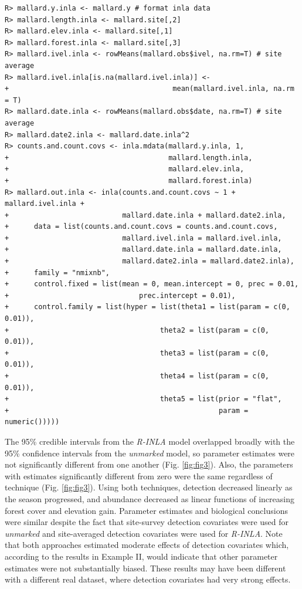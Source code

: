 \documentclass{article}
\begin{document}
\begin{verbatim}
R> mallard.y.inla <- mallard.y # format inla data
R> mallard.length.inla <- mallard.site[,2]
R> mallard.elev.inla <- mallard.site[,1]
R> mallard.forest.inla <- mallard.site[,3]
R> mallard.ivel.inla <- rowMeans(mallard.obs$ivel, na.rm=T) # site average
R> mallard.ivel.inla[is.na(mallard.ivel.inla)] <- 
+                                       mean(mallard.ivel.inla, na.rm = T)
R> mallard.date.inla <- rowMeans(mallard.obs$date, na.rm=T) # site average
R> mallard.date2.inla <- mallard.date.inla^2
R> counts.and.count.covs <- inla.mdata(mallard.y.inla, 1, 
+                                      mallard.length.inla,
+                                      mallard.elev.inla, 
+                                      mallard.forest.inla)
R> mallard.out.inla <- inla(counts.and.count.covs ~ 1 + mallard.ivel.inla +
+                           mallard.date.inla + mallard.date2.inla,
+      data = list(counts.and.count.covs = counts.and.count.covs,
+                           mallard.ivel.inla = mallard.ivel.inla,
+                           mallard.date.inla = mallard.date.inla,
+                           mallard.date2.inla = mallard.date2.inla),
+      family = "nmixnb",
+      control.fixed = list(mean = 0, mean.intercept = 0, prec = 0.01,
+                               prec.intercept = 0.01),
+      control.family = list(hyper = list(theta1 = list(param = c(0, 0.01)),
+                                    theta2 = list(param = c(0, 0.01)),
+                                    theta3 = list(param = c(0, 0.01)),
+                                    theta4 = list(param = c(0, 0.01)),
+                                    theta5 = list(prior = "flat",
+                                                  param = numeric()))))
\end{verbatim}

The 95\% credible intervals from the \emph{R-INLA} model overlapped broadly with the 95\% confidence intervals from the \emph{unmarked} model, so parameter estimates were not significantly different from one another (Fig. \ref{fig:fig3}). Also, the parameters with estimates significantly different from zero were the same regardless of technique (Fig. \ref{fig:fig3}). Using both techniques, detection decreased linearly as the season progressed, and abundance decreased as linear functions of increasing forest cover and elevation gain. Parameter estimates and biological conclusions were similar despite the fact that site-survey detection covariates were used for \emph{unmarked} and site-averaged detection covariates were used for \emph{R-INLA}. Note that both approaches estimated moderate effects of detection covariates which, according to the results in Example II, would indicate that other parameter estimates were not substantially biased. These results may have been different with a different real dataset, where detection covariates had very strong effects.
\end{document}
